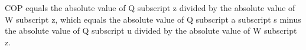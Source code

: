 COP equals the absolute value of Q subscript z divided by the absolute value of W subscript z, which equals the absolute value of Q subscript a subscript s minus the absolute value of Q subscript u divided by the absolute value of W subscript z.